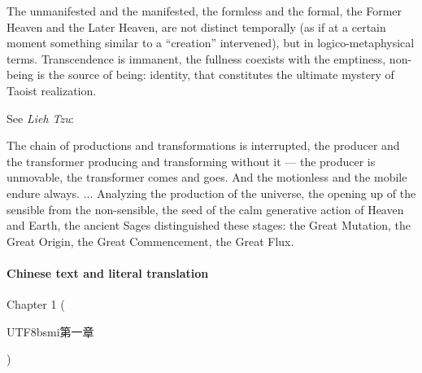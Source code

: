 The unmanifested and the manifested, the formless and the formal, the Former Heaven and the Later Heaven, are not distinct temporally (as if at a certain moment something similar to a ``creation'' intervened), but in logico-metaphysical terms. Transcendence is immanent, the fullness coexists with the emptiness, non-being is the source of being: identity, that constitutes the ultimate mystery of Taoist realization.

See \emph{Lieh Tzu}:

\begin{quotex}
The chain of productions and transformations is interrupted, the producer and the transformer producing and transforming without it --- the producer is unmovable, the transformer comes and goes. And the motionless and the mobile endure always. ... Analyzing the production of the universe, the opening up of the sensible from the non-sensible, the seed of the calm generative action of Heaven and Earth, the ancient Sages distinguished these stages: the Great Mutation, the Great Origin, the Great Commencement, the Great Flux.
\end{quotex}


\paragraph{Chinese text and literal translation}


Chapter 1 (\begin{CJK*}{UTF8}{bsmi}第一章\end{CJK*})

